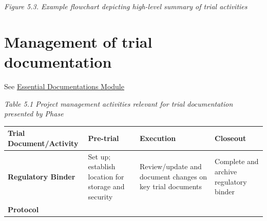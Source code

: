 \documentclass[]{book}
\theoremstyle{definition}
\theoremstyle{definition}
\theoremstyle{definition}
\theoremstyle{remark}
\begin{document}
\emph{Figure 5.3. Example flowchart depicting high-level summary of
trial activities}

\section{Management of trial
documentation}\label{management-of-trial-documentation}

See \protect\hyperlink{Essentialux5cux2520Documentations}{Essential
Documentations Module}

\emph{Table 5.1 Project management activities relevant for trial
documentation presented by Phase}

\begin{longtable}[]{@{}llll@{}}
\toprule
\begin{minipage}[b]{0.19\columnwidth}\raggedright\strut
\textbf{Trial Document/Activity}\strut
\end{minipage} & \begin{minipage}[b]{0.23\columnwidth}\raggedright\strut
\textbf{Pre-trial}\strut
\end{minipage} & \begin{minipage}[b]{0.21\columnwidth}\raggedright\strut
\textbf{Execution}\strut
\end{minipage} & \begin{minipage}[b]{0.25\columnwidth}\raggedright\strut
\textbf{Closeout}\strut
\end{minipage}\tabularnewline
\midrule
\endhead
\begin{minipage}[t]{0.19\columnwidth}\raggedright\strut
\textbf{Regulatory Binder}\strut
\end{minipage} & \begin{minipage}[t]{0.23\columnwidth}\raggedright\strut
Set up; establish location for storage and security\strut
\end{minipage} & \begin{minipage}[t]{0.21\columnwidth}\raggedright\strut
Review/update and document changes on key trial documents\strut
\end{minipage} & \begin{minipage}[t]{0.25\columnwidth}\raggedright\strut
Complete and archive regulatory binder\strut
\end{minipage}\tabularnewline
\begin{minipage}[t]{0.19\columnwidth}\raggedright\strut
\textbf{Protocol}\strut
\end{minipage} & \begin{minipage}[t]{0.23\columnwidth}\raggedright\strut

\end{minipage}
\end{longtable}
\end{document}
